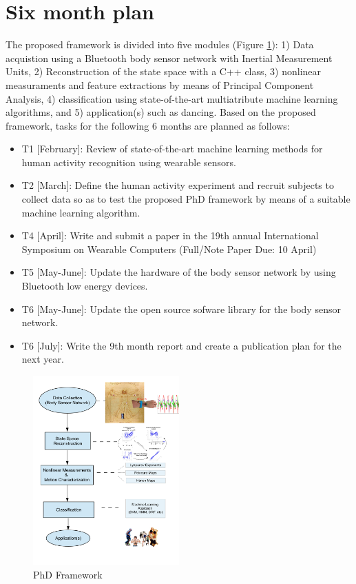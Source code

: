 \documentclass{sigchi}
\begin{document}
\section{Six month plan}
The proposed framework is divided into five modules (Figure \ref{fig:proposedapproach}): 
1) Data acquistion using a Bluetooth body sensor network with Inertial Measurement 
Units, 
2) Reconstruction of the state space with a C++ class, 
3) nonlinear measuraments and feature extractions by means of Principal Component
Analysis, 
4) classification using state-of-the-art multiatribute machine learning algorithms, 
and  5) application(s) such as dancing. 
Based on the proposed framework, 
tasks for the following 6 months are planned as follows:
\begin{itemize}
\item T1 [February]: Review of state-of-the-art machine learning methods 
for human activity recognition using wearable sensors.
\item T2 [March]: Define the human activity experiment and recruit subjects 
to collect data so as to test the proposed PhD framework by means of a suitable
machine learning algorithm.
\item T4 [April]: Write and submit a paper in the 19th annual International Symposium
on Wearable Computers (Full/Note Paper Due: 10 April)
\item T5 [May-June]: Update the hardware of the body sensor network by using
Bluetooth low energy devices.  
\item T6 [May-June]: Update the open source sofware library for the body sensor
network.
\item T6 [July]: Write the 9th month report and create a publication
plan for the next year.
\end{itemize}

\begin{figure}[htbp!] 
\centering    
\includegraphics[width=0.5\textwidth]{proposedapproach_v1}
\caption[PA]{PhD Framework}
\label{fig:proposedapproach}
\end{figure}
\end{document}

